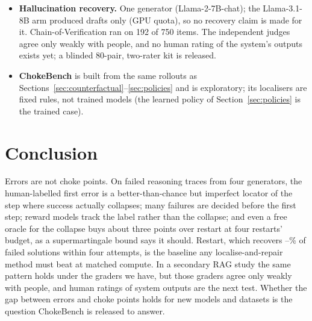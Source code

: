 \documentclass[10pt,twocolumn]{article}
\begin{document}
\begin{itemize}
not been done. The protocol and blinded sheets are released, and no coding result is reported.
\item \textbf{Hallucination recovery.} One generator (Llama-2-7B-chat); the Llama-3.1-8B arm produced
drafts only (GPU quota), so no recovery claim is made for it. Chain-of-Verification ran on 192 of
750 items. The independent judges agree only weakly with people, and no human rating of the
system's outputs exists yet; a blinded 80-pair, two-rater kit is released.
\item \textbf{ChokeBench} is built from the same rollouts as Sections~\ref{sec:counterfactual}--\ref{sec:policies}
and is exploratory; its localisers are fixed rules, not trained models (the learned policy of
Section~\ref{sec:policies} is the trained case).
\end{itemize}

\section{Conclusion}
Errors are not choke points. On failed reasoning traces from four generators, the human-labelled
first error is a better-than-chance but imperfect locator of the step where success actually
collapses; many failures are decided before the first step; reward models track the label rather
than the collapse; and even a free oracle for the collapse buys about three points over restart at
four restarts' budget, as a supermartingale bound says it should. Restart, which recovers
\recMinFour--\recMaxFour\% of failed solutions within four attempts, is the baseline any
localise-and-repair method must beat at matched compute. In a secondary RAG study the same pattern
holds under the graders we have, but those graders agree only weakly with people, and human ratings
of system outputs are the next test. Whether the gap between errors and choke points holds for new
models and datasets is the question ChokeBench is released to answer.


\onecolumn

\end{document}

